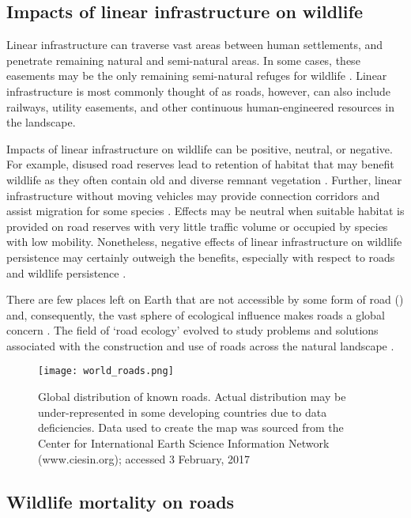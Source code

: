 \subsection{Impacts of linear infrastructure on wildlife}

Linear infrastructure can traverse vast areas between human settlements, and penetrate remaining natural and semi-natural areas. In some cases, these easements may be the only remaining semi-natural refuges for wildlife \citep{benn91}. Linear infrastructure is most commonly thought of as roads, however, can also include railways, utility easements, and other continuous human-engineered resources in the landscape.

Impacts of linear infrastructure on wildlife can be positive, neutral, or negative. For example, disused road reserves lead to retention of habitat that may benefit wildlife as they often contain old and diverse remnant vegetation \citep{lent11}. Further, linear infrastructure without moving vehicles may provide connection corridors and assist migration for some species \citep{rvdr15}. Effects may be neutral when suitable habitat is provided on road reserves with very little traffic volume or occupied by species with low mobility. Nonetheless, negative effects of linear infrastructure on wildlife persistence may certainly outweigh the benefits, especially with respect to roads and wildlife persistence \citep{fahr09}.

There are few places left on Earth that are not accessible by some form of road () and, consequently, the vast sphere of ecological influence makes roads a global concern \citep{laur14}. The field of `road ecology' evolved to study problems and solutions associated with the construction and use of roads across the natural landscape \citep{form03,rvdr15}. 

\begin{figure*}[!t]
  \centering
  \texttt{[image: world\_roads.png]}
  \caption[Global distribution of known roads]{Global distribution of known roads. Actual distribution may be under-represented in some developing countries due to data deficiencies. Data used to create the map was sourced from the Center for International Earth Science Information Network (www.ciesin.org); accessed 3 February, 2017}
  \label{roads}
\end{figure*}

\subsection{Wildlife mortality on roads}

